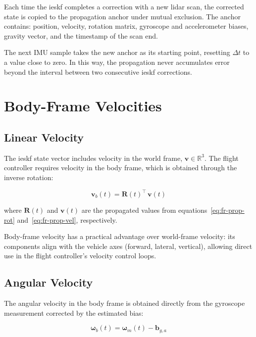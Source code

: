 Each time the \gls{ieskf} completes a correction with a new \gls{lidar} scan, the
corrected state is copied to the propagation anchor under mutual exclusion. The
anchor contains: position, velocity, rotation matrix, gyroscope and accelerometer
biases, gravity vector, and the timestamp of the scan end.

The next IMU sample takes the new anchor as its starting point, resetting
$\Delta t$ to a value close to zero. In this way, the propagation never accumulates
error beyond the interval between two consecutive \gls{ieskf} corrections.

\section{Body-Frame Velocities}
\label{sec:fr-velocities}

\subsection{Linear Velocity}
\label{sec:fr-linear-vel}

The \gls{ieskf} state vector includes velocity in the world frame,
$\mathbf{v} \in \mathbb{R}^3$. The flight controller requires velocity in the body
frame, which is obtained through the inverse rotation:

\begin{equation}
    \mathbf{v}_b(t) = \mathbf{R}(t)^\top \, \mathbf{v}(t)
    \label{eq:fr-vel-body}
\end{equation}

where $\mathbf{R}(t)$ and $\mathbf{v}(t)$ are the propagated values from
equations~\eqref{eq:fr-prop-rot} and~\eqref{eq:fr-prop-vel}, respectively.

Body-frame velocity has a practical advantage over world-frame velocity: its
components align with the vehicle axes (forward, lateral, vertical), allowing
direct use in the flight controller's velocity control loops.

\subsection{Angular Velocity}
\label{sec:fr-angular-vel}

The angular velocity in the body frame is obtained directly from the gyroscope
measurement corrected by the estimated bias:

\begin{equation}
    \boldsymbol{\omega}_b(t) = \boldsymbol{\omega}_m(t) - \mathbf{b}_{g,a}
    \label{eq:fr-omega-body}
\end{equation}

